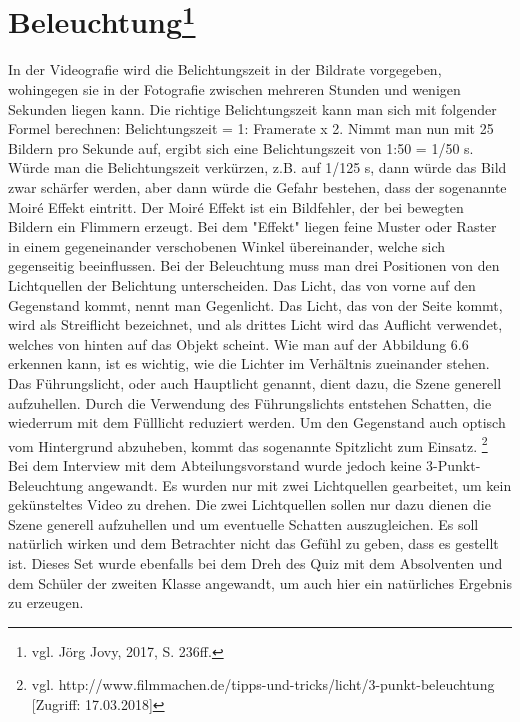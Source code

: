 \section[Beleuchtung]{Beleuchtung\protect\footnote{\label{}vgl. Jörg Jovy, 2017, S. 236ff.}}
In der Videografie wird die Belichtungszeit in der Bildrate vorgegeben, wohingegen sie in der Fotografie zwischen mehreren Stunden und wenigen Sekunden liegen kann.
Die richtige Belichtungszeit kann man sich mit folgender Formel berechnen: Belichtungszeit = 1: Framerate x 2. Nimmt man nun mit 25 Bildern pro Sekunde auf, ergibt sich eine Belichtungszeit von 1:50 = 1/50 s. Würde man die Belichtungszeit verkürzen, z.B. auf 1/125 s, dann würde das Bild zwar schärfer werden, aber dann würde die Gefahr bestehen, dass der sogenannte Moir\'{e} Effekt eintritt. Der Moir\'{e} Effekt ist ein Bildfehler, der bei bewegten Bildern ein Flimmern erzeugt. Bei dem "Effekt" liegen feine Muster oder Raster in einem gegeneinander verschobenen Winkel übereinander, welche sich gegenseitig beeinflussen. 
Bei der Beleuchtung muss man drei Positionen von den Lichtquellen der Belichtung unterscheiden. Das Licht, das von vorne auf den Gegenstand kommt, nennt man Gegenlicht. Das Licht, das von der Seite kommt, wird als Streiflicht bezeichnet, und als drittes Licht wird das Auflicht verwendet, welches von hinten auf das Objekt scheint.
Wie man auf der Abbildung 6.6 erkennen kann, ist es wichtig, wie die Lichter im Verhältnis zueinander stehen. Das Führungslicht, oder auch Hauptlicht genannt, dient dazu, die Szene generell aufzuhellen. Durch die Verwendung des Führungslichts entstehen Schatten, die wiederrum mit dem Fülllicht reduziert werden. Um den Gegenstand auch optisch vom Hintergrund abzuheben, kommt das sogenannte Spitzlicht zum Einsatz. \footnote{\label{}vgl. http://www.filmmachen.de/tipps-und-tricks/licht/3-punkt-beleuchtung [Zugriff: 17.03.2018]}
Bei dem Interview mit dem Abteilungsvorstand wurde jedoch keine 3-Punkt-Beleuchtung angewandt. Es wurden nur mit zwei Lichtquellen gearbeitet, um kein gekünsteltes Video zu drehen. Die zwei Lichtquellen sollen nur dazu dienen die Szene generell aufzuhellen und um eventuelle Schatten auszugleichen. Es soll natürlich wirken und dem Betrachter nicht das Gefühl zu geben, dass es gestellt ist.  Dieses Set wurde ebenfalls bei dem Dreh des Quiz mit dem Absolventen und dem Schüler der zweiten Klasse angewandt, um auch hier ein natürliches Ergebnis zu erzeugen.

